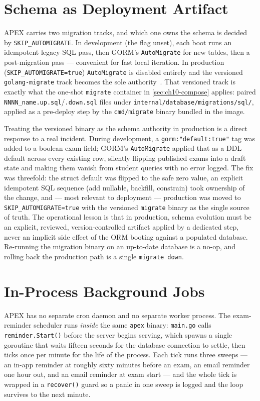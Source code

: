 \section{Schema as Deployment Artifact}\label{sec:ch10-migrations}

APEX carries two migration tracks, and which one owns the schema is decided by \texttt{SKIP\_AUTOMIGRATE}. In development (the flag unset), each boot runs an idempotent legacy-SQL pass, then GORM's \texttt{AutoMigrate} for new tables, then a post-migration pass --- convenient for fast local iteration. In production (\texttt{SKIP\_AUTOMIGRATE=true}) \texttt{AutoMigrate} is disabled entirely and the versioned \texttt{golang-migrate} track becomes the sole authority~\cite{golangmigrate}. That versioned track is exactly what the one-shot \texttt{migrate} container in \cref{sec:ch10-compose} applies: paired \texttt{NNNN\_name.up.sql}/\texttt{.down.sql} files under \texttt{internal/database/migrations/sql/}, applied as a pre-deploy step by the \texttt{cmd/migrate} binary bundled in the image.

Treating the versioned binary as the schema authority in production is a direct response to a real incident. During development, a \texttt{gorm:"default:true"} tag was added to a boolean exam field; GORM's \texttt{AutoMigrate} applied that as a DDL default across every existing row, silently flipping published exams into a draft state and making them vanish from student queries with no error logged. The fix was threefold: the struct default was flipped to the safe zero value, an explicit idempotent SQL sequence (add nullable, backfill, constrain) took ownership of the change, and --- most relevant to deployment --- production was moved to \texttt{SKIP\_AUTOMIGRATE=true} with the versioned \texttt{migrate} binary as the single source of truth. The operational lesson is that in production, schema evolution must be an explicit, reviewed, version-controlled artifact applied by a dedicated step, never an implicit side effect of the ORM booting against a populated database. Re-running the migration binary on an up-to-date database is a no-op, and rolling back the production path is a single \texttt{migrate down}.

\section{In-Process Background Jobs}\label{sec:ch10-scheduler}

APEX has no separate cron daemon and no separate worker process. The exam-reminder scheduler runs \emph{inside} the same \texttt{apex} binary: \texttt{main.go} calls \texttt{reminder.Start()} before the server begins serving, which spawns a single goroutine that waits fifteen seconds for the database connection to settle, then ticks once per minute for the life of the process. Each tick runs three sweeps --- an in-app reminder at roughly sixty minutes before an exam, an email reminder one hour out, and an email reminder at exam start --- and the whole tick is wrapped in a \texttt{recover()} guard so a panic in one sweep is logged and the loop survives to the next minute.

